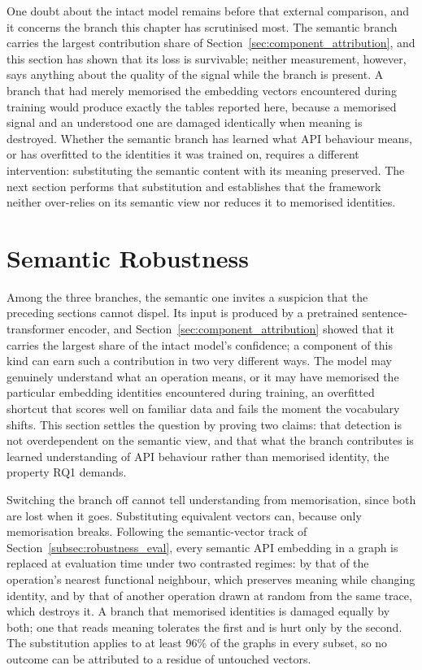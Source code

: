 \documentclass[%
    BCOR=10mm,
    DIV=13,
    toc=bibliography,
    toc=listof,
    oneside,
    12pt,
]{scrbook}
\begin{document}
One doubt about the intact model remains before that external comparison,
and it concerns the branch this chapter has scrutinised most. The semantic
branch carries the largest contribution share of
Section~\ref{sec:component_attribution}, and this section has shown that its
loss is survivable; neither measurement, however, says anything about the
quality of the signal while the branch is present. A branch that had merely
memorised the embedding vectors encountered during training would produce
exactly the tables reported here, because a memorised signal and an
understood one are damaged identically when meaning is destroyed. Whether the
semantic branch has learned what API behaviour means, or has overfitted to the
identities it was trained on, requires a different intervention: substituting
the semantic content with its meaning preserved. The next section performs that
substitution and establishes that the framework neither over-relies on its
semantic view nor reduces it to memorised identities.


\section{Semantic Robustness}
\label{sec:robustness_results}

Among the three branches, the semantic one invites a suspicion that the
preceding sections cannot dispel. Its input is produced by a pretrained
sentence-transformer encoder, and
Section~\ref{sec:component_attribution} showed that it carries the largest
share of the intact model's confidence; a component of this kind can earn
such a contribution in two very different ways. The model may genuinely
understand what an operation means, or it may have memorised the particular
embedding identities encountered during training, an overfitted shortcut
that scores well on familiar data and fails the moment the vocabulary
shifts. This section settles the question by proving two claims: that
detection is not overdependent on the semantic view, and that what the
branch contributes is learned understanding of API behaviour rather than
memorised identity, the property RQ1 demands.

Switching the branch off cannot tell understanding from memorisation, since
both are lost when it goes. Substituting equivalent vectors can, because only
memorisation breaks. Following the semantic-vector track of
Section~\ref{subsec:robustness_eval}, every semantic API embedding in a graph
is replaced at evaluation time under two contrasted regimes: by that of the
operation's nearest functional neighbour, which preserves meaning while
changing identity, and by that of another operation drawn at random from the
same trace, which destroys it. A branch that memorised identities is damaged
equally by both; one that reads meaning tolerates the first and is hurt only
by the second. The substitution applies to at least 96\% of the graphs in
every subset, so no outcome can be attributed to a residue of untouched
vectors.
\end{document}
